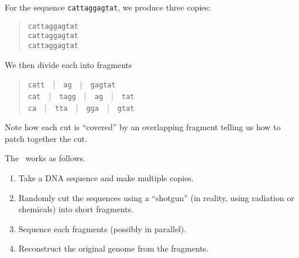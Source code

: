 \begin{cluster}
\label{grp:xmpl:genome::sequence}

\begin{example}
\label{xmpl:genome::sequence}
For the sequence
\texttt{cattaggagtat}, 
we produce three copies:

\begin{quote}
\texttt{cattaggagtat}\\
\texttt{cattaggagtat}\\
\texttt{cattaggagtat}
\end{quote}

We then divide each into fragments
\begin{quote}
\texttt{catt}~~|~~\texttt{ag}~~|~~\texttt{gagtat}
\\
\texttt{cat}~~|~~\texttt{tagg}~~|~~\texttt{ag}~~|~~\texttt{tat}
\\
\texttt{ca}~~|~~\texttt{tta}~~|~~\texttt{gga}~~|~~\texttt{gtat}
\end{quote}
 
Note how each cut is ``covered'' by an overlapping fragment telling us
how to patch together the cut.

\end{example}
\end{cluster}

\begin{cluster}
\label{grp:def:genome::shotgun-method}

\begin{definition}
\label{def:genome::shotgun-method}
The~ works as follows.
\begin{enumerate}
\item Take a DNA sequence and make multiple copies.  

\item Randomly cut the sequences using a ``shotgun'' (in reality,
  using radiation or chemicals) into short fragments.

\item Sequence each fragments (possibly in parallel).

\item Reconstruct the original genome from the fragments.  
\end{enumerate}

\end{definition}
\end{cluster}

